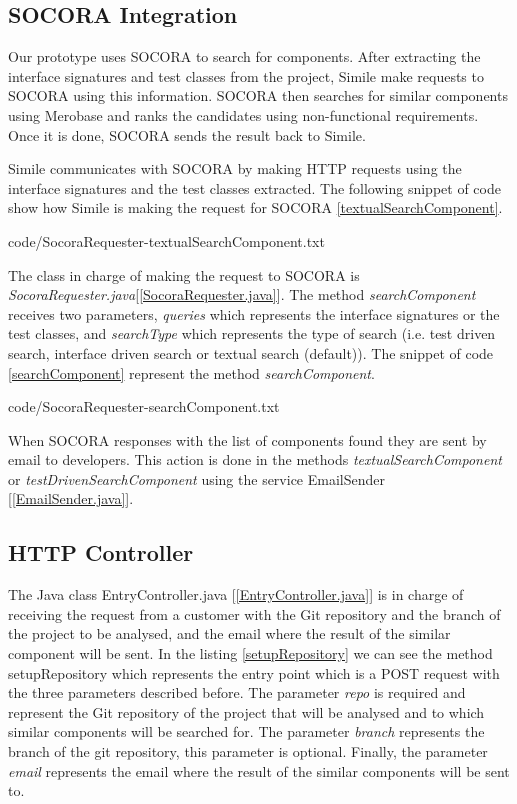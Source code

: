 \subsection{SOCORA Integration}
Our prototype uses SOCORA to search for components. After extracting the interface signatures and test classes from the project, Simile make requests to SOCORA using this information. SOCORA then searches for similar components using Merobase and ranks the candidates using non-functional requirements. Once it is done, SOCORA sends the result back to Simile.

Simile communicates with SOCORA by making HTTP requests using the interface signatures and the test classes extracted. The following snippet of code show how Simile is making the request for SOCORA \ref{textualSearchComponent}.


{code/SocoraRequester-textualSearchComponent.txt}

The class in charge of making the request to SOCORA is \emph{SocoraRequester.java}[\ref{SocoraRequester.java}]. The method \emph{searchComponent} receives two parameters, \emph{queries} which represents the interface signatures or the test classes, and \emph{searchType} which represents the type of search (i.e. test driven search, interface driven search or textual search (default)). The snippet of code \ref{searchComponent} represent the method \emph{searchComponent}.


{code/SocoraRequester-searchComponent.txt}

When SOCORA responses with the list of components found they are sent by email to developers. This action is done in the methods \emph{textualSearchComponent} or \emph{testDrivenSearchComponent} using the service EmailSender [\ref{EmailSender.java}].

\subsection{HTTP Controller}
The Java class EntryController.java [\ref{EntryController.java}] is in charge of receiving the request from a customer with the Git repository and the branch of the project to be analysed, and the email where the result of the similar component will be sent. In the listing \ref{setupRepository} we can see the method setupRepository which represents the entry point which is a POST request with the three parameters described before. The parameter \emph{repo} is required and represent the Git repository of the project that will be analysed and to which similar components will be searched for. The parameter \emph{branch} represents the branch of the git repository, this parameter is optional. Finally, the parameter \emph{email} represents the email where the result of the similar components will be sent to.

